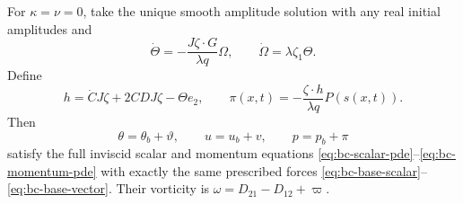 \begin{proposition}
\label{prop:bc-uncut}
For $\kappa=\nu=0$, take the unique smooth amplitude solution with any
real initial amplitudes and
\begin{equation}
\dot\Theta=-\frac{J\zeta\cdot G}{\lambda q}\Omega,\qquad
\dot\Omega=\lambda\zeta_1\Theta.
\label{eq:bc-amplitudes}
\end{equation}
Define
\begin{equation}
h=\dot C J\zeta+2C D J\zeta-\Theta e_2,\qquad
\pi(x,t)=-\frac{\zeta\cdot h}{\lambda q}P(s(x,t)).
\label{eq:bc-pressure}
\end{equation}
Then
\[
\theta=\theta_b+\vartheta,\qquad u=u_b+v,\qquad p=p_b+\pi
\]
satisfy the full inviscid scalar and momentum equations
\eqref{eq:bc-scalar-pde}--\eqref{eq:bc-momentum-pde} with exactly the
same prescribed forces \eqref{eq:bc-base-scalar}--\eqref{eq:bc-base-vector}.
Their vorticity is
$\omega=D_{21}-D_{12}+\varpi$.
\end{proposition}

